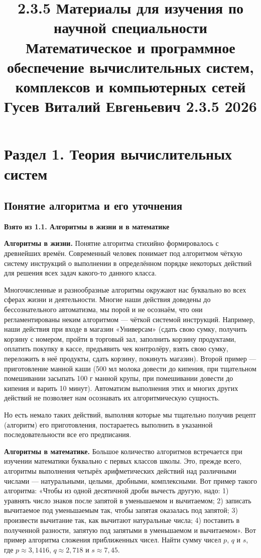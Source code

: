\documentclass[a4paper,12pt]{article}
\title{2.3.5 Материалы для изучения по научной специальности \\
Математическое и программное обеспечение вычислительных систем, комплексов и компьютерных сетей \\
Гусев Виталий Евгеньевич 2.3.5 2026}
\date{}
\begin{document}
\maketitle

\tableofcontents
\newpage

\section{Раздел 1. Теория вычислительных систем}

\subsection{Понятие алгоритма и его уточнения}

\textbf{Взято из 1.1. Алгоритмы в жизни и в математике}

\textbf{Алгоритмы в жизни.} Понятие алгоритма стихийно формировалось с древнейших времён. Современный человек понимает под алгоритмом чёткую систему инструкций о выполнении в определённом порядке некоторых действий для решения всех задач какого-то данного класса.

Многочисленные и разнообразные алгоритмы окружают нас буквально во всех сферах жизни и деятельности. Многие наши действия доведены до бессознательного автоматизма, мы порой и не осознаём, что они регламентированы неким алгоритмом --- чёткой системой инструкций. Например, наши действия при входе в магазин «Универсам» (сдать свою сумку, получить корзину с номером, пройти в торговый зал, заполнить корзину продуктами, оплатить покупку в кассе, предъявить чек контролёру, взять свою сумку, переложить в неё продукты, сдать корзину, покинуть магазин). Второй пример --- приготовление манной каши (500 мл молока довести до кипения, при тщательном помешивании засыпать 100 г манной крупы, при помешивании довести до кипения и варить 10 минут). Автоматизм выполнения этих и многих других действий не позволяет нам осознавать их алгоритмическую сущность.

Но есть немало таких действий, выполняя которые мы тщательно получив рецепт (алгоритм) его приготовления, постараетесь выполнить в указанной последовательности все его предписания.

\textbf{Алгоритмы в математике.} Большое количество алгоритмов встречается при изучении математики буквально с первых классов школы. Это, прежде всего, алгоритмы выполнения четырёх арифметических действий над различными числами --- натуральными, целыми, дробными, комплексными. Вот пример такого алгоритма: «Чтобы из одной десятичной дроби вычесть другую, надо: 1) уравнять число знаков после запятой в уменьшаемом и вычитаемом; 2) записать вычитаемое под уменьшаемым так, чтобы запятая оказалась под запятой; 3) произвести вычитание так, как вычитают натуральные числа; 4) поставить в полученной разности, запятую под запятыми в уменьшаемом и вычитаемом». Вот пример алгоритма сложения приближенных чисел. Найти сумму чисел \(p\), \(q\) и \(s\), где \(p \approx 3,1416\), \(q \approx 2,718\) и \(s \approx 7,45\).
\end{document}
